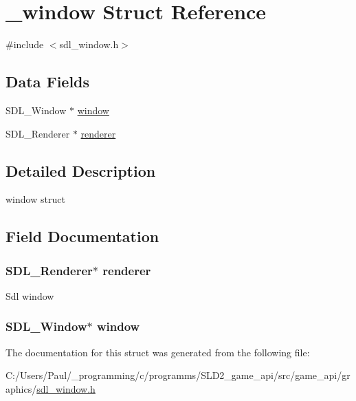 \hypertarget{struct__window}{\section{\+\_\+window Struct Reference}
\label{struct__window}
}


{\ttfamily \#include $<$sdl\+\_\+window.\+h$>$}

\subsection*{Data Fields}
\begin{DoxyCompactItemize}
\item 
S\+D\+L\+\_\+\+Window $\ast$ \hyperlink{struct__window_aaa8e409e04dcf575ef63fd5fb3db06f9}{window}
\item 
S\+D\+L\+\_\+\+Renderer $\ast$ \hyperlink{struct__window_a966da7a60c4ea3ba301e26ccc5efe452}{renderer}
\end{DoxyCompactItemize}


\subsection{Detailed Description}
window struct 

\subsection{Field Documentation}
\hypertarget{struct__window_a966da7a60c4ea3ba301e26ccc5efe452}{
\subsubsection[{renderer}]{\setlength{\rightskip}{0pt plus 5cm}S\+D\+L\+\_\+\+Renderer$\ast$ renderer}}\label{struct__window_a966da7a60c4ea3ba301e26ccc5efe452}
Sdl window \hypertarget{struct__window_aaa8e409e04dcf575ef63fd5fb3db06f9}{
\subsubsection[{window}]{\setlength{\rightskip}{0pt plus 5cm}S\+D\+L\+\_\+\+Window$\ast$ window}}\label{struct__window_aaa8e409e04dcf575ef63fd5fb3db06f9}


The documentation for this struct was generated from the following file\+:\begin{DoxyCompactItemize}
\item 
C\+:/\+Users/\+Paul/\+\_\+programming/c/programms/\+S\+L\+D2\+\_\+game\+\_\+api/src/game\+\_\+api/graphics/\hyperlink{sdl__window_8h}{sdl\+\_\+window.\+h}\end{DoxyCompactItemize}
